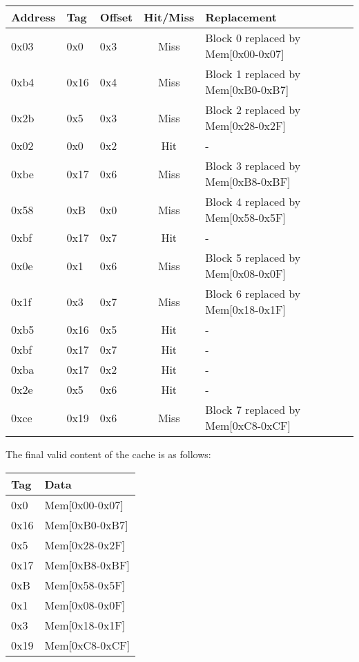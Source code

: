 \documentclass[a4paper,12pt]{article}
\begin{document}
\begin{table}[H]
	\centering
	\begin{tabular}{lllcl}
		\toprule
		Address & Tag & Offset & Hit/Miss & Replacement \\
		\midrule
		0x03 & 0x0 & 0x3 & Miss & Block 0 replaced by Mem[0x00-0x07] \\
		0xb4 & 0x16 & 0x4 & Miss & Block 1 replaced by Mem[0xB0-0xB7] \\
		0x2b & 0x5 & 0x3 & Miss & Block 2 replaced by Mem[0x28-0x2F] \\
		0x02 & 0x0 & 0x2 & Hit & - \\
		0xbe & 0x17 & 0x6 & Miss & Block 3 replaced by Mem[0xB8-0xBF] \\
		0x58 & 0xB & 0x0 & Miss & Block 4 replaced by Mem[0x58-0x5F] \\
		0xbf & 0x17 & 0x7 & Hit & - \\
		0x0e & 0x1 & 0x6 & Miss & Block 5 replaced by Mem[0x08-0x0F] \\
		0x1f & 0x3 & 0x7 & Miss & Block 6 replaced by Mem[0x18-0x1F] \\
		0xb5 & 0x16 & 0x5 & Hit & - \\
		0xbf & 0x17 & 0x7 & Hit & - \\
		0xba & 0x17 & 0x2 & Hit & - \\
		0x2e & 0x5 & 0x6 & Hit & - \\
		0xce & 0x19 & 0x6 & Miss & Block 7 replaced by Mem[0xC8-0xCF] \\
		\bottomrule
	\end{tabular}
\end{table}

The final valid content of the cache is as follows:

\begin{table}[H]
	\centering	
	\begin{tabular}{ll}
		\toprule
		Tag & Data \\
		\midrule
		0x0 & Mem[0x00-0x07] \\
		0x16 & Mem[0xB0-0xB7] \\
		0x5 & Mem[0x28-0x2F] \\
		0x17 & Mem[0xB8-0xBF] \\
		0xB & Mem[0x58-0x5F] \\
		0x1 & Mem[0x08-0x0F] \\
		0x3 & Mem[0x18-0x1F] \\
		0x19 & Mem[0xC8-0xCF] \\
		\bottomrule
	\end{tabular}
\end{table}
\end{document}

